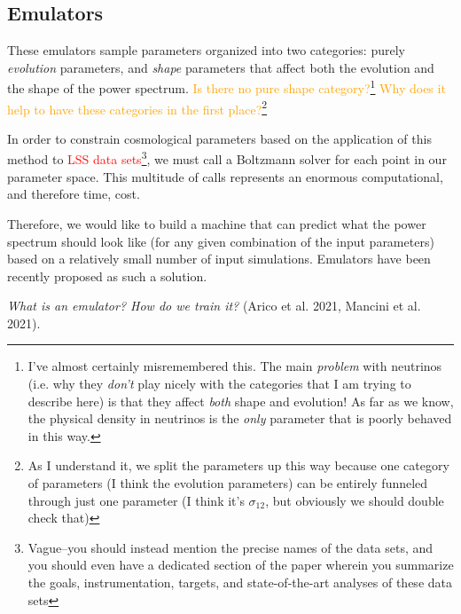 \documentclass[11pt]{article}
\begin{document}
\begin{centering}
\section{Emulators}
\end{centering}

These emulators sample parameters organized into two categories: purely
\textit{evolution} parameters, and \textit{shape} parameters that
affect both the evolution and the
shape of the power spectrum. \textcolor{orange}{Is there no pure shape
category?\footnote{
    I've almost certainly misremembered this.
    The main \textit{problem} with neutrinos (i.e. why they \textit{don't}
    play nicely with the categories that I am trying to describe here)
    is that they affect \textit{both} shape and evolution! As far as we know,
    the physical density in neutrinos is the \textit{only} parameter that
    is poorly behaved in this way.
}
Why does it help to have these categories in the first place?}\footnote{
    As I understand it, we split the parameters up this way because
    one category of parameters (I think the evolution parameters)
    can be entirely funneled through just one parameter
    (I think it's $\sigma_{12}$, but obviously we should double check that)
}

In order to constrain cosmological parameters based on the application of this
method to \textcolor{red}{LSS data sets}\footnote{
	Vague--you should instead mention the precise names of the data sets,
	and you should even have a dedicated section of the paper wherein you
	summarize the goals, instrumentation, targets, and state-of-the-art
	analyses of these data sets
}, we must call a Boltzmann solver for each point in our parameter space. This
multitude of calls represents an enormous computational, and therefore time,
cost.

Therefore, we would like to build a machine that can predict what the power
spectrum should look like (for any given combination of the input parameters)
based on a relatively small number of input simulations. Emulators have been
recently  proposed as such a solution.

\textit{What is an emulator? How do we train it?} (Arico et al. 2021, Mancini
et al. 2021).
\end{document}
